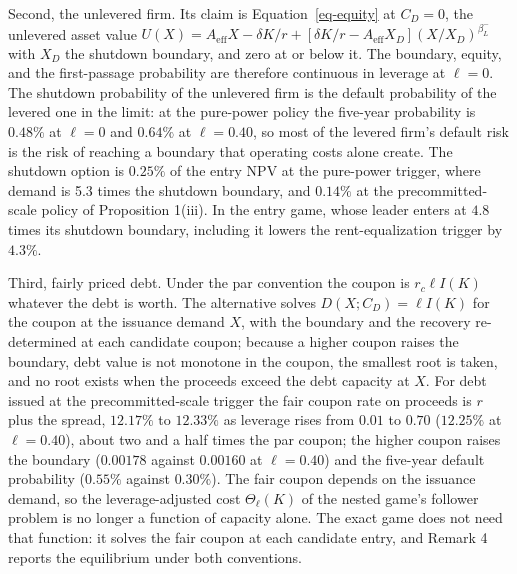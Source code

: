 \documentclass[
  11pt,
  letterpaper,
]{scrartcl}
\begin{document}
Second, the unlevered firm. Its claim is Equation~\ref{eq-equity} at
\(C_D = 0\), the unlevered asset value
\(U(X) = A_{\text{eff}}X - \delta K/r + [\delta K/r - A_{\text{eff}}X_D](X/X_D)^{\beta_L^-}\)
with \(X_D\) the shutdown boundary, and zero at or below it. The
boundary, equity, and the first-passage probability are therefore
continuous in leverage at \(\ell = 0\). The shutdown probability of the
unlevered firm is the default probability of the levered one in the
limit: at the pure-power policy the five-year probability is \(0.48\%\)
at \(\ell = 0\) and \(0.64\%\) at \(\ell = 0.40\), so most of the
levered firm's default risk is the risk of reaching a boundary that
operating costs alone create. The shutdown option is \(0.25\%\) of the
entry NPV at the pure-power trigger, where demand is 5.3 times the
shutdown boundary, and \(0.14\%\) at the precommitted-scale policy of
Proposition 1(iii). In the entry game, whose leader enters at \(4.8\)
times its shutdown boundary, including it lowers the rent-equalization
trigger by \(4.3\%\).

Third, fairly priced debt. Under the par convention the coupon is
\(r_c \ell I(K)\) whatever the debt is worth. The alternative solves
\(D(X; C_D) = \ell I(K)\) for the coupon at the issuance demand \(X\),
with the boundary and the recovery re-determined at each candidate
coupon; because a higher coupon raises the boundary, debt value is not
monotone in the coupon, the smallest root is taken, and no root exists
when the proceeds exceed the debt capacity at \(X\). For debt issued at
the precommitted-scale trigger the fair coupon rate on proceeds is \(r\)
plus the spread, \(12.17\%\) to \(12.33\%\) as leverage rises from
\(0.01\) to \(0.70\) (\(12.25\%\) at \(\ell = 0.40\)), about two and a
half times the par coupon; the higher coupon raises the boundary
(\(0.00178\) against \(0.00160\) at \(\ell = 0.40\)) and the five-year
default probability (\(0.55\%\) against \(0.30\%\)). The fair coupon
depends on the issuance demand, so the leverage-adjusted cost
\(\Theta_\ell(K)\) of the nested game's follower problem is no longer a
function of capacity alone. The exact game does not need that function:
it solves the fair coupon at each candidate entry, and Remark 4 reports
the equilibrium under both conventions.
\end{document}
